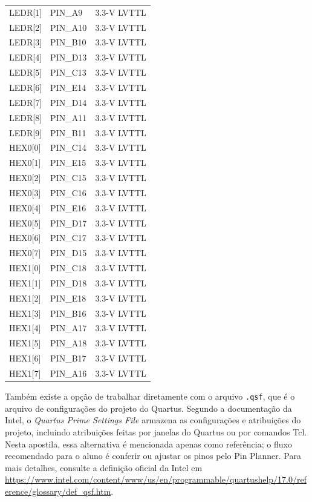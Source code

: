 \documentclass[12pt,a4paper]{article}
\begin{document}
\begin{longtable}{>{\ttfamily}p{}p{}p{}}
LEDR[1] & PIN\_A9 & 3.3-V LVTTL \\
LEDR[2] & PIN\_A10 & 3.3-V LVTTL \\
LEDR[3] & PIN\_B10 & 3.3-V LVTTL \\
LEDR[4] & PIN\_D13 & 3.3-V LVTTL \\
LEDR[5] & PIN\_C13 & 3.3-V LVTTL \\
LEDR[6] & PIN\_E14 & 3.3-V LVTTL \\
LEDR[7] & PIN\_D14 & 3.3-V LVTTL \\
LEDR[8] & PIN\_A11 & 3.3-V LVTTL \\
LEDR[9] & PIN\_B11 & 3.3-V LVTTL \\
HEX0[0] & PIN\_C14 & 3.3-V LVTTL \\
HEX0[1] & PIN\_E15 & 3.3-V LVTTL \\
HEX0[2] & PIN\_C15 & 3.3-V LVTTL \\
HEX0[3] & PIN\_C16 & 3.3-V LVTTL \\
HEX0[4] & PIN\_E16 & 3.3-V LVTTL \\
HEX0[5] & PIN\_D17 & 3.3-V LVTTL \\
HEX0[6] & PIN\_C17 & 3.3-V LVTTL \\
HEX0[7] & PIN\_D15 & 3.3-V LVTTL \\
HEX1[0] & PIN\_C18 & 3.3-V LVTTL \\
HEX1[1] & PIN\_D18 & 3.3-V LVTTL \\
HEX1[2] & PIN\_E18 & 3.3-V LVTTL \\
HEX1[3] & PIN\_B16 & 3.3-V LVTTL \\
HEX1[4] & PIN\_A17 & 3.3-V LVTTL \\
HEX1[5] & PIN\_A18 & 3.3-V LVTTL \\
HEX1[6] & PIN\_B17 & 3.3-V LVTTL \\
HEX1[7] & PIN\_A16 & 3.3-V LVTTL \\
\bottomrule
\end{longtable}

Também existe a opção de trabalhar diretamente com o arquivo \texttt{.qsf}, que é o arquivo de configurações do projeto do Quartus. Segundo a documentação da Intel, o \textit{Quartus Prime Settings File} armazena as configurações e atribuições do projeto, incluindo atribuições feitas por janelas do Quartus ou por comandos Tcl. Nesta apostila, essa alternativa é mencionada apenas como referência; o fluxo recomendado para o aluno é conferir ou ajustar os pinos pelo Pin Planner. Para mais detalhes, consulte a definição oficial da Intel em \url{https://www.intel.com/content/www/us/en/programmable/quartushelp/17.0/reference/glossary/def_qsf.htm}.
\end{document}

